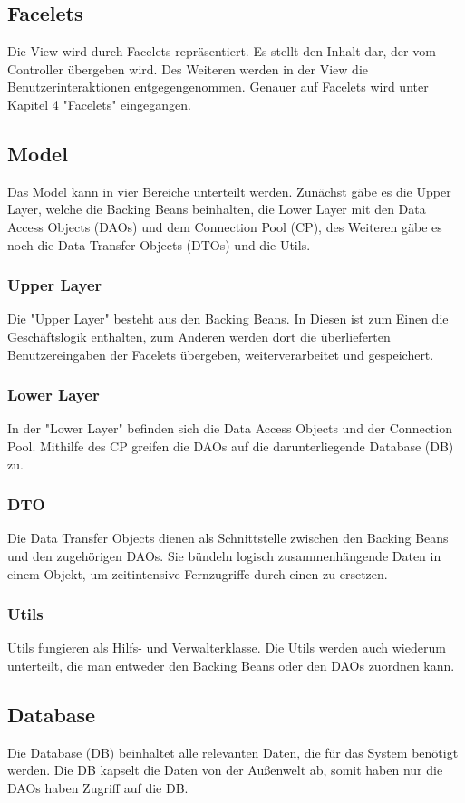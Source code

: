     \subsection{Facelets}
    	Die View wird durch Facelets repräsentiert. Es stellt den Inhalt dar, der vom Controller übergeben wird. Des Weiteren werden in der View die Benutzerinteraktionen entgegengenommen. Genauer auf Facelets wird unter Kapitel 4 "Facelets" eingegangen.
   	\subsection{Model}
   	Das Model kann in vier Bereiche unterteilt werden. Zunächst gäbe es die Upper Layer, welche die Backing Beans beinhalten, die Lower Layer mit den Data Access Objects (DAOs) und dem Connection Pool (CP), des Weiteren gäbe es noch die Data Transfer Objects (DTOs) und die Utils. 
   		\subsubsection{Upper Layer}
   		Die "Upper Layer" besteht aus den Backing Beans. In Diesen ist zum Einen die Geschäftslogik enthalten, zum Anderen werden dort die überlieferten Benutzereingaben der Facelets übergeben, weiterverarbeitet und gespeichert.
    	\subsubsection{Lower Layer}
    	In der "Lower Layer" befinden sich die Data Access Objects und der Connection Pool. Mithilfe des CP greifen die DAOs auf die darunterliegende Database (DB) zu.
    	\subsubsection{DTO}
    	Die Data Transfer Objects dienen als Schnittstelle zwischen den Backing Beans und den zugehörigen DAOs. Sie bündeln logisch zusammenhängende Daten in einem Objekt, um zeitintensive Fernzugriffe durch einen zu ersetzen.
    	\subsubsection{Utils}
    	Utils fungieren als Hilfs- und Verwalterklasse. Die Utils werden auch wiederum unterteilt, die man entweder den Backing Beans oder den DAOs zuordnen kann. 
    \subsection{Database}
    Die Database (DB) beinhaltet alle relevanten Daten, die für das System benötigt werden. Die DB kapselt die Daten von der Außenwelt ab, somit haben nur die DAOs haben Zugriff auf die DB. 
